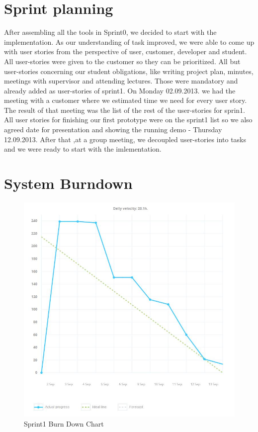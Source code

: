 \section{Sprint planning}
After assembling all the tools in Sprint0, we decided to start with the implementation.
As our understanding of task improved, we were able to come up with user stories from the perspective of user, customer, developer and student.
All user-stories were given to the customer so they can be prioritized. 
All but user-stories concerning our student obligations, like writing project plan, minutes, meetings with supervisor and attending lectures.
Those were mandatory and already added as user-stories of sprint1.
On Monday 02.09.2013. we had the meeting with a customer where we estimated time we need for every user story.
The result of that meeting was the list of the rest of the user-stories for sprin1.
All user stories for finishing our first prototype were on the sprint1 list so we also agreed date for presentation and showing the running demo - Thursday 12.09.2013. 
After that ,at a group meeting, we decoupled user-stories into tasks and we were ready to start with the imlementation.



\section{System Burndown}

\begin{figure}[!t]
	\centering
		\includegraphics[width=16cm]{burn_down_chart.jpg}
	\caption{Sprint1 Burn Down Chart}
	\label{fig:sprint1_burn_down_chart}
\end{figure}

